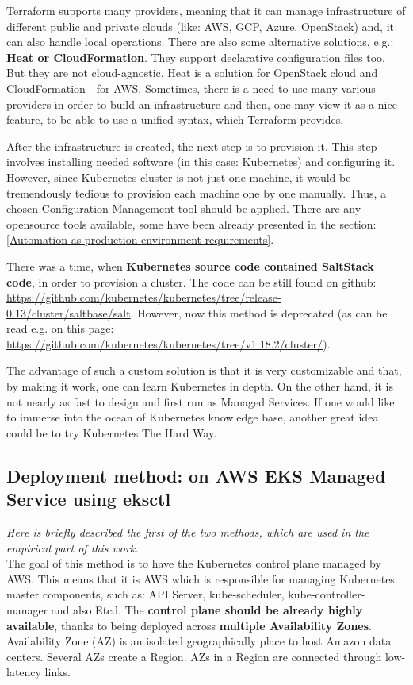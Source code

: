 Terraform supports many providers, meaning that it can manage infrastructure of different public and private clouds (like: AWS, GCP, Azure, OpenStack) and, it can also handle local operations\cite{terraform}. There are also some alternative solutions, e.g.: \textbf{Heat or CloudFormation}. They support declarative configuration files too. But they are not cloud-agnostic. Heat is a solution for OpenStack cloud and CloudFormation - for AWS. Sometimes, there is a need to use many various providers in order to build an infrastructure and then, one may view it as a nice feature, to be able to use a unified syntax, which Terraform provides\cite{terraform-vs}.

After the infrastructure is created, the next step is to provision it. This step involves installing needed software (in this case: Kubernetes) and configuring it. However, since Kubernetes cluster is not just one machine, it would be tremendously tedious to provision each machine one by one manually. Thus, a chosen Configuration Management tool should be applied. There are any opensource tools available, some have been already presented in the section: \ref{Automation as production environment requirements}.

There was a time, when \textbf{Kubernetes source code contained SaltStack code}, in order to provision a cluster. The code can be still found on github: \url{https://github.com/kubernetes/kubernetes/tree/release-0.13/cluster/saltbase/salt}. However, now this method is deprecated (as can be read e.g. on this page: \url{https://github.com/kubernetes/kubernetes/tree/v1.18.2/cluster/}).

The advantage of such a custom solution is that it is very customizable and that, by making it work, one can learn Kubernetes in depth. On the other hand, it is not nearly as fast to design and first run as Managed Services. If one would like to immerse into the ocean of Kubernetes knowledge base, another great idea could be to try Kubernetes The Hard Way\cite{k8s-thw}.


\subsection{Deployment method: on AWS EKS Managed Service using eksctl}
\textit{Here is briefly described the first of the two methods, which are used in the empirical part of this work.}
\\

The goal of this method is to have the Kubernetes control plane managed by AWS. This means that it is AWS which is responsible for managing Kubernetes master components, such as: API Server, kube-scheduler, kube-controller-manager and also Etcd. The \textbf{control plane should be already highly available}, thanks to being deployed across \textbf{multiple Availability Zones}\cite{what-is-eks}. Availability Zone (AZ) is an isolated geographically place to host Amazon data centers. Several AZs create a Region. AZs in a Region are connected through low-latency links\cite{az}.

